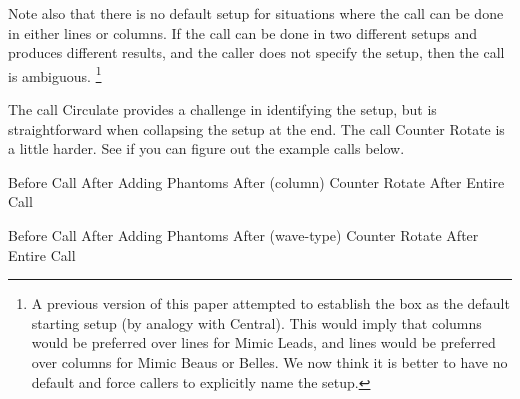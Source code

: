 \documentclass[12pt]{article}
\begin{document}
Note also that there is no default setup for situations where
the call can be done in either lines or columns.
If the call can be done in two different setups and produces different
results, and the caller does not specify the setup,
then the call is ambiguous.
\footnote{A previous version of this paper attempted to establish
the box as the default starting setup (by analogy with Central).
This would imply that columns would be preferred over lines
for Mimic Leads, and lines would be preferred over columns for
Mimic Beaus or Belles.  We now think it is better to have
no default and force callers to explicitly name the setup.}

The call Circulate provides a challenge in identifying the setup,
but is straightforward when collapsing the setup at the end.
The call Counter Rotate is a little harder.  See if you can
figure out the example calls below.

\displaytwo
{\cr
 }
{Before Call}
{\cr
 \cr
 \cr
 }
{After Adding Phantoms}
\displaytwo
{
     \cr
     }
{After (column) Counter Rotate}
{\cr
 }
{After Entire Call}
\endexample

\displaytwo
{\cr
 }
{Before Call}
{\cr
 \cr
 \cr
 }
{After Adding Phantoms}
\displaytwo
{\cr
 \cr
 \cr
 \cr
 \cr
 \cr
 \cr
 }
{After (wave-type) Counter Rotate}
{\cr
 \cr
 \cr
 }
{After Entire Call}
\endexample
\end{document}
